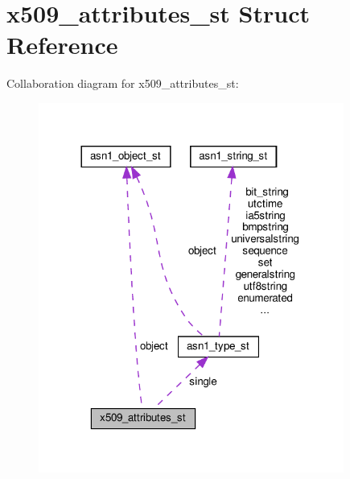 \hypertarget{structx509__attributes__st}{}\section{x509\+\_\+attributes\+\_\+st Struct Reference}
\label{structx509__attributes__st}


Collaboration diagram for x509\+\_\+attributes\+\_\+st\+:
\nopagebreak
\begin{figure}[H]
\begin{center}
\leavevmode
\includegraphics[width=284pt]{structx509__attributes__st__coll__graph}
\end{center}
\end{figure}
